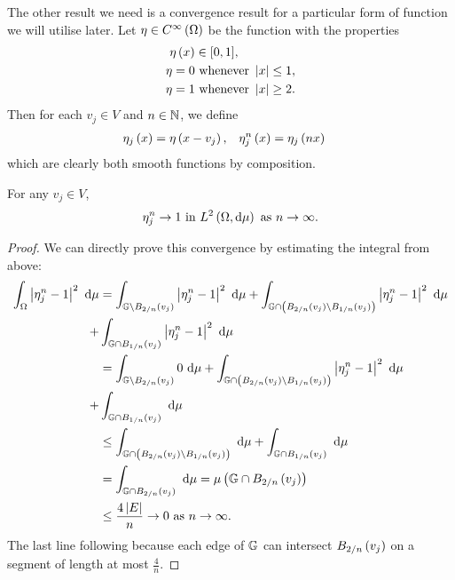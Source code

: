 The other result we need is a convergence result for a particular form of function we will utilise later.
Let $\eta\in C^{\infty}\left( \Omega \right)$ be the function with the properties
\begin{align*}
	\eta\left( x \right) &\in [0,1], \\
	\eta = 0 &\text{ whenever } \left\lvert x \right\rvert\leq 1, \\
	\eta = 1 &\text{ whenever } \left\lvert x \right\rvert\geq 2.
\end{align*}
Then for each $v_j\in V$ and $n\in\mathbb{N}$, we define
\begin{align*}
	\eta_j\left( x \right) = \eta\left( x-v_j \right), &\quad \eta_j^n\left( x \right) = \eta_j\left( nx \right)
\end{align*}
which are clearly both smooth functions by composition.

\begin{lemma} \label{lem:etaConv}
	For any $v_j\in V$, 
	\begin{align*}
		\eta_j^n \rightarrow 1 \text{ in } L^{2}\left( \Omega,\mathrm{d}\mu \right) \ \text{as} \ n \rightarrow\infty.
	\end{align*}
\end{lemma}
\begin{proof}
	We can directly prove this convergence by estimating the integral from above:
	\begin{align*}
		\begin{split}
			\int_{\Omega}\left\lvert \eta_j^n-1 \right\rvert^2 \ \mathrm{d}\mu &= \int_{\mathbb{G}\setminus B_{2/n}\left( v_j \right)}\left\lvert \eta_j^n-1 \right\rvert^2 \ \mathrm{d}\mu + \int_{\mathbb{G} \cap \left( B_{2/n}\left( v_j \right) \setminus B_{1/n}\left( v_j \right) \right)}\left\lvert \eta_j^n-1 \right\rvert^2 \ \mathrm{d}\mu \\ + &\int_{\mathbb{G}\cap B_{1/n}\left( v_j \right)}\left\lvert \eta_j^n-1 \right\rvert^2 \ \mathrm{d}\mu \\
			&= \int_{\mathbb{G}\setminus B_{2/n}\left( v_j \right)}0 \ \mathrm{d}\mu + \int_{\mathbb{G} \cap \left( B_{2/n}\left( v_j \right) \setminus B_{1/n}\left( v_j \right) \right)}\left\lvert \eta_j^n-1 \right\rvert^2 \ \mathrm{d}\mu \\ + &\int_{\mathbb{G}\cap B_{1/n}\left( v_j \right)} \ \mathrm{d}\mu \\
			&\leq \int_{\mathbb{G} \cap \left( B_{2/n}\left( v_j \right) \setminus B_{1/n}\left( v_j \right) \right)} \ \mathrm{d}\mu + \int_{\mathbb{G}\cap B_{1/n}\left( v_j \right)} \ \mathrm{d}\mu \\
			&=\int_{\mathbb{G}\cap B_{2/n}\left( v_j \right)} \ \mathrm{d}\mu = \mu\left( \mathbb{G}\cap B_{2/n}\left( v_j \right) \right) \\
			&\leq \frac{4 \left\lvert E \right\rvert}{n} \rightarrow0 \ \text{as} \ n \rightarrow\infty.
		\end{split}
	\end{align*}
	The last line following because each edge of $\mathbb{G}$ can intersect $B_{2/n}\left( v_j \right)$ on a segment of length at most $\frac{4}{n}$.
\end{proof}

